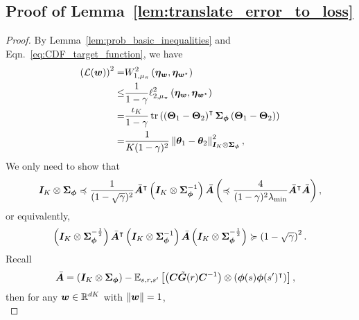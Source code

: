 \subsection{Proof of Lemma~\ref{lem:translate_error_to_loss}}\label{appendix:proof_translate_error_to_loss}
\begin{proof}
By Lemma~\ref{lem:prob_basic_inequalities} and Eqn.~\eqref{eq:CDF_target_function}, we have
\begin{equation*}
\begin{aligned}
    \left({{\mathcal{L}}({\bm{w}})}\right)^2=&W_{1,\mu_{\pi}}^2\left({\bm{\eta}_{{\bm{w}}},\bm{\eta}_{{\bm{w}}^{\star}}}\right)\\
    \leq&\frac{1}{1-\gamma}\ell_{2,\mu_{\pi}}^2\left({\bm{\eta}_{{\bm{w}}},\bm{\eta}_{{\bm{w}}^{\star}}}\right)\\
    =&\frac{\iota_K}{1-\gamma}\operatorname{tr}\left({\left({{\bm{\Theta}}_1-{\bm{\Theta}}_2}\right)^{\intercal}{\bm{\Sigma}}_{{\bm{\phi}}}\left({{\bm{\Theta}}_1-{\bm{\Theta}}_2}\right)}\right) \\
    =&\frac{1}{K(1-\gamma)^2}\left\|{{\bm{\theta}}_1-{\bm{\theta}}_2}\right\|^2_{{\bm{I}}_K\otimes{\bm{\Sigma}}_{{\bm{\phi}}}},
\end{aligned}
\end{equation*}
We only need to show that
\begin{equation}\label{eq:bar_A_lower_bound}
\begin{aligned}
        {\bm{I}}_K\otimes{\bm{\Sigma}}_{{\bm{\phi}}}\preccurlyeq\frac{1}{(1-\sqrt\gamma)^2}\bar{{\bm{A}}}^{\intercal}\left({{\bm{I}}_K\otimes{\bm{\Sigma}}_{{\bm{\phi}}}^{-1}}\right)\bar{{\bm{A}}}\left({\preccurlyeq\frac{4}{(1-\gamma)^2\lambda_{\min}}\bar{{\bm{A}}}^{\intercal}\bar{{\bm{A}}}}\right),
\end{aligned}
\end{equation}
or equivalently,
    \begin{equation*}
\begin{aligned}
        \left({{\bm{I}}_K\otimes{\bm{\Sigma}}_{{\bm{\phi}}}^{-\frac{1}{2}}}\right)\bar{{\bm{A}}}^{\intercal}\left({{\bm{I}}_K\otimes{\bm{\Sigma}}_{{\bm{\phi}}}^{-1}}\right)\bar{{\bm{A}}}\left({{\bm{I}}_K\otimes{\bm{\Sigma}}_{{\bm{\phi}}}^{-\frac{1}{2}}}\right)\succcurlyeq \left({1-\sqrt\gamma}\right)^2.
\end{aligned}
\end{equation*}
Recall
    \begin{equation*}
\begin{aligned}
        \bar{{\bm{A}}}&=\left({{\bm{I}}_K\otimes{\bm{\Sigma}}_{{\bm{\phi}}}}\right)-{\mathbb E}_{s, r, s^\prime}\left[{\left({{\bm{C}}\tilde{{\bm{G}}}(r){\bm{C}}^{-1}}\right)\otimes\left({{\bm{\phi}}(s){\bm{\phi}}(s^\prime)^{\intercal}}\right)}\right],
\end{aligned}
\end{equation*}
then for any ${\bm{w}}\in{\mathbb R}^{dK}$ with $\left\|{{\bm{w}}}\right\|=1$, 
    \begin{equation*}

\end{equation*}
\end{proof}
